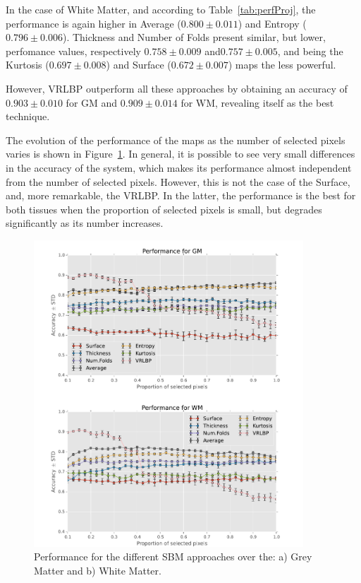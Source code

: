 In the case of White Matter, and according to Table~\ref{tab:perfProj}, the performance is again higher in Average ($0.800 \pm 0.011$) and Entropy ($0.796 \pm 0.006$). Thickness and Number of Folds present similar, but lower, perfomance values, respectively $0.758 \pm 0.009$ and$0.757 \pm 0.005$, and being the Kurtosis ($0.697 \pm 0.008$) and Surface ($0.672 \pm 0.007$) maps the less powerful. 

However, VRLBP outperform all these approaches by obtaining an accuracy of $0.903 \pm 0.010$ for \ac{GM} and $0.909 \pm 0.014$ for \ac{WM}, revealing itself as the best technique. 

The evolution of the performance of the maps as the number of selected pixels varies is shown in Figure~\ref{fig:figureGM}. In general, it is possible to see very small differences in the accuracy of the system, which makes its performance almost independent from the number of selected pixels. However, this is not the case of the Surface, and, more remarkable, the VRLBP. In the latter, the performance is the best for both tissues when the proportion of selected pixels is small, but degrades significantly as its number increases. 

\begin{figure}[htp]
	\centering
	\includegraphics[width=0.9\textwidth]{Graphics/ch6/10-comparisonPerformance}
	\caption{Performance for the different \ac{SBM} approaches over the: a) Grey Matter and b) White Matter.}
	\label{fig:figureGM}
\end{figure}

